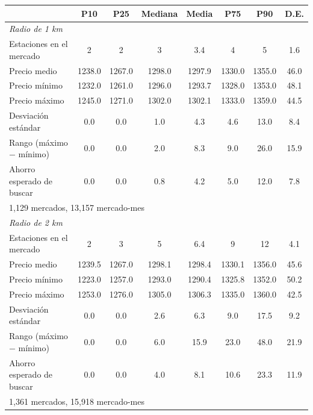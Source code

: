 \begin{tabular}{lccccccc}
\toprule
 & P10 & P25 & Mediana & Media & P75 & P90 & D.E. \\
\midrule
\multicolumn{8}{l}{\emph{Radio de 1 km}} \\
Estaciones en el mercado & 2 & 2 & 3 & 3.4 & 4 & 5 & 1.6 \\
Precio medio & 1238.0 & 1267.0 & 1298.0 & 1297.9 & 1330.0 & 1355.0 & 46.0 \\
Precio mínimo & 1232.0 & 1261.0 & 1296.0 & 1293.7 & 1328.0 & 1353.0 & 48.1 \\
Precio máximo & 1245.0 & 1271.0 & 1302.0 & 1302.1 & 1333.0 & 1359.0 & 44.5 \\
Desviación estándar & 0.0 & 0.0 & 1.0 & 4.3 & 4.6 & 13.0 & 8.4 \\
Rango (máximo $-$ mínimo) & 0.0 & 0.0 & 2.0 & 8.3 & 9.0 & 26.0 & 15.9 \\
Ahorro esperado de buscar & 0.0 & 0.0 & 0.8 & 4.2 & 5.0 & 12.0 & 7.8 \\
\multicolumn{8}{l}{\footnotesize 1,129 mercados, 13,157 mercado-mes} \\
\midrule
\multicolumn{8}{l}{\emph{Radio de 2 km}} \\
Estaciones en el mercado & 2 & 3 & 5 & 6.4 & 9 & 12 & 4.1 \\
Precio medio & 1239.5 & 1267.0 & 1298.1 & 1298.4 & 1330.1 & 1356.0 & 45.6 \\
Precio mínimo & 1223.0 & 1257.0 & 1293.0 & 1290.4 & 1325.8 & 1352.0 & 50.2 \\
Precio máximo & 1253.0 & 1276.0 & 1305.0 & 1306.3 & 1335.0 & 1360.0 & 42.5 \\
Desviación estándar & 0.0 & 0.0 & 2.6 & 6.3 & 9.0 & 17.5 & 9.2 \\
Rango (máximo $-$ mínimo) & 0.0 & 0.0 & 6.0 & 15.9 & 23.0 & 48.0 & 21.9 \\
Ahorro esperado de buscar & 0.0 & 0.0 & 4.0 & 8.1 & 10.6 & 23.3 & 11.9 \\
\multicolumn{8}{l}{\footnotesize 1,361 mercados, 15,918 mercado-mes} \\
\bottomrule
\end{tabular}

